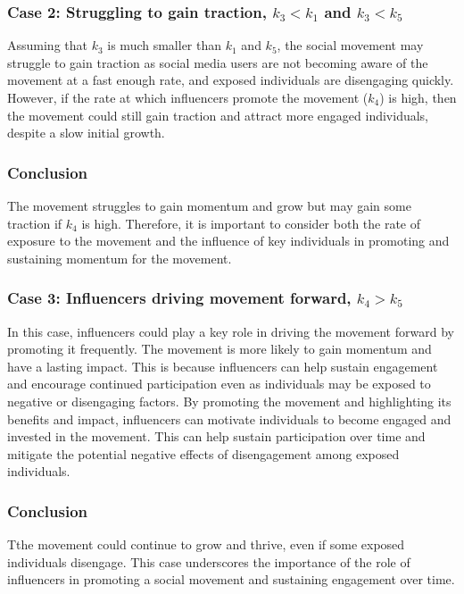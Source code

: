 \documentclass{article}
\begin{document}
    \subsubsection*{Case 2: Struggling to gain traction, $k_3 < k_1$ and $k_3 < k_5$}
    \begin{tcolorbox}
    Assuming that $k_3$ is much smaller than $k_1$ and $k_5$, the social movement may struggle to gain traction as social media users are not becoming aware of the movement at a fast enough rate, and exposed individuals are disengaging quickly. However, if the rate at which influencers promote the movement ($k_4$) is high, then the movement could still gain traction and attract more engaged individuals, despite a slow initial growth.
    \subsubsection*{Conclusion} The movement  struggles to gain momentum and grow but may gain some traction if $k_4$ is high. Therefore, it is important to consider both the rate of exposure to the movement and the influence of key individuals in promoting and sustaining momentum for the movement.
    \end{tcolorbox}
    
    \subsubsection*{Case 3: Influencers driving movement forward, $k_4 > k_5$} \normalfont
    \begin{tcolorbox}
     In this case, influencers could play a key role in driving the movement forward by promoting it frequently. The movement is more likely to gain momentum and have a lasting impact. This is because influencers can help sustain engagement and encourage continued participation even as individuals may be exposed to negative or disengaging factors. By promoting the movement and highlighting its benefits and impact, influencers can motivate individuals to become engaged and invested in the movement. This can help sustain participation over time and mitigate the potential negative effects of disengagement among exposed individuals.
    \subsubsection*{Conclusion}Tthe movement could continue to grow and thrive, even if some exposed individuals disengage. This case underscores the importance of the role of influencers in promoting a social movement and sustaining engagement over time. 
    \end{tcolorbox}
\end{document}
